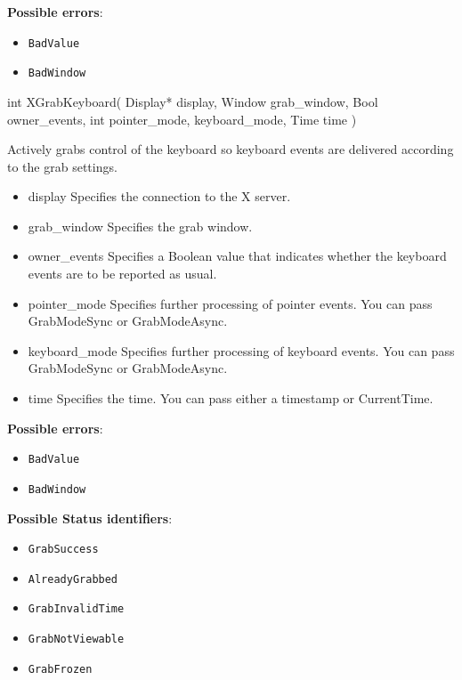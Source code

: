 \documentclass{report}
\begin{document}
\begin{itemize}
        \textbf{Possible errors}:
        \begin{itemize}
            \item \texttt{BadValue}
            \item \texttt{BadWindow}
        \end{itemize}

        \begin{cppcode}
            int XGrabKeyboard(
                Display* display,
                Window grab_window,
                Bool owner_events,
                int pointer_mode, keyboard_mode,
                Time time
            )
        \end{cppcode}
        \bigbreak \noindent
        Actively grabs control of the keyboard so keyboard events are delivered according to the grab settings.

        \begin{itemize}
            \item display Specifies the connection to the X server.
            \item grab\_window Specifies the grab window.
            \item owner\_events Specifies a Boolean value that indicates whether the keyboard events are to be reported as usual.
            \item pointer\_mode Specifies further processing of pointer events. You can pass GrabModeSync or GrabModeAsync.
            \item keyboard\_mode Specifies further processing of keyboard events. You can pass GrabModeSync or GrabModeAsync.
            \item time Specifies the time. You can pass either a timestamp or CurrentTime.
        \end{itemize}

        \textbf{Possible errors}:
        \begin{itemize}
            \item \texttt{BadValue}
            \item \texttt{BadWindow}
        \end{itemize}

        \textbf{Possible Status identifiers}:
        \begin{itemize}
            \item \texttt{GrabSuccess}
            \item \texttt{AlreadyGrabbed}
            \item \texttt{GrabInvalidTime}
            \item \texttt{GrabNotViewable}
            \item \texttt{GrabFrozen}
        \end{itemize}


\end{itemize}
\end{document}
